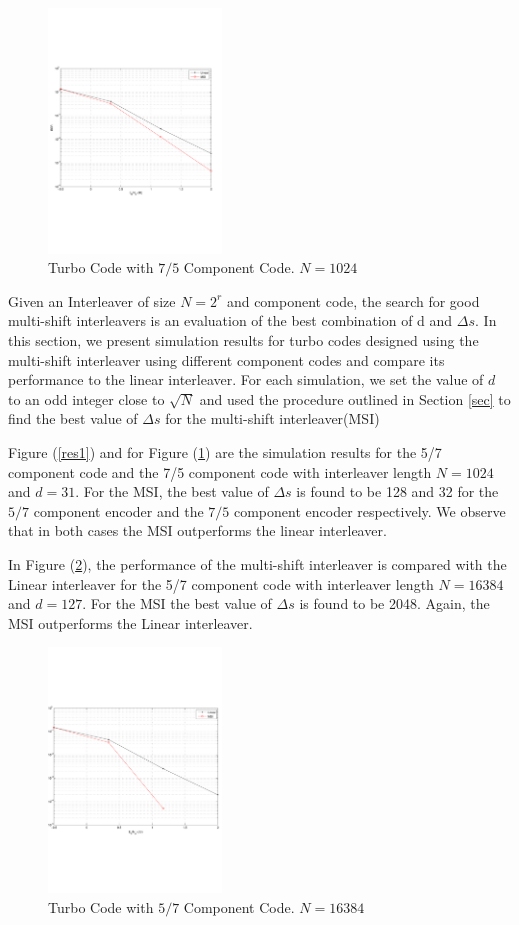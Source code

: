 \documentclass[twocolumn]{article}
\begin{document}
		\begin{figure}[h!]
\centering
		\includegraphics[height = 6.5cm,trim={0 7.2cm 0 6cm},clip]{msi_linear_1024_1000_7_5Frames.pdf}
		\caption{Turbo Code with $7/5$ Component Code. $N=1024$}
		\label{res2}
		\end{figure}
Given an Interleaver of size $N=2^r$ and component code, the search for good
multi-shift interleavers is an evaluation of the best combination of d and $\Delta s$.
 In this section, we present simulation 
results
for turbo codes designed using the multi-shift interleaver using different component
codes and compare its performance to the linear interleaver. For each simulation, 
we set the value of $d$ to an odd integer close to $\sqrt{N}$
and used the procedure outlined in Section \ref{sec} to find the best value
of $\Delta s$ for the multi-shift interleaver(MSI)

 Figure (\ref{res1}) and for  Figure (\ref{res2}) are the simulation results for the 5/7 
 component code
 and the 7/5 component code with  interleaver length $N=1024$ and $d=31$. For
 the MSI, the best value of $\Delta s$ is found to be 128 and 32 for the
  $5/7$ component encoder and the
  $7/5$ component encoder respectively. We observe that in both cases
 the MSI outperforms the linear interleaver.
 
 In Figure (\ref{res3}), the performance of the multi-shift 
interleaver is compared with the Linear interleaver for the 
5/7 component code with interleaver length $N=16384$ and $d=127$. For the MSI
the best value of $\Delta s$ is found to be 2048. Again, the MSI outperforms the 
Linear interleaver. 

		\begin{figure}[h!]
\centering
		\includegraphics[height = 6.5cm,trim={0 7.2cm 0 6cm},clip]{msi_linear_16384.pdf}
		\caption{Turbo Code with $5/7$ Component Code. $N=16384$}
		\label{res3}
		\end{figure}
\end{document}

